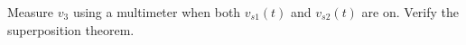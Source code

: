 \documentclass[11pt]{article}
\begin{document}
\begin{question}
    \begin{subquestion}{Measure $v_3$ using a multimeter when both $v_{s1}(t)$ and $v_{s2}(t)$ are on. Verify the superposition theorem.}
    \end{subquestion}


\end{question}
\end{document}
